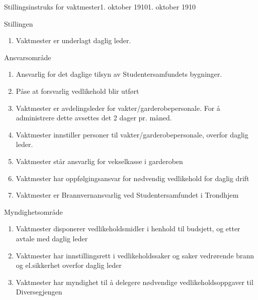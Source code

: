 \begin{instruks}{Stillingsinstruks for vaktmester}{1. oktober 1910}{1. oktober 1910}
    \begin{instruksledd}{Stillingen}
    \begin{enumerate}
    \item Vaktmester er underlagt daglig leder.
    \end{enumerate}    
    \end{instruksledd}

    \begin{instruksledd}{Ansvarsområde}
    \begin{enumerate}
    \item Ansvarlig for det daglige tilsyn av Studentersamfundets bygninger.
    \item Påse at forsvarlig vedlikehold blir utført
    \item Vaktmester er avdelingsleder for vakter/garderobepersonale. For å administrere dette avsettes det 2 dager pr.
måned.
    \item Vaktmester innstiller personer til vakter/garderobepersonale, overfor daglig leder.
    \item Vaktmester står ansvarlig for vekselkasse i garderoben
    \item Vaktmester har oppfølgingsansvar for nødvendig vedlikehold for daglig drift
    \item Vaktmester er Brannvernansvarlig ved Studentersamfundet i Trondhjem
    \end{enumerate}    
    \end{instruksledd}

    \begin{instruksledd}{Myndighetsområde}
    \begin{enumerate}
    \item Vaktmester disponerer vedlikeholdsmidler i henhold til budsjett, og etter avtale med daglig leder
    \item Vaktmester har innstillingsrett i vedlikeholdssaker og saker vedrørende brann og el.sikkerhet overfor daglig
leder
    \item Vaktmester har myndighet til å delegere nødvendige vedlikeholdsoppgaver til Diversegjengen
    \end{enumerate}
    \end{instruksledd}
    

\end{instruks}
